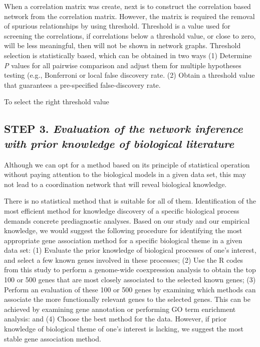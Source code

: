 When a correlation matrix was create, next is to construct the correlation based network from the correlation matrix. However, the matrix is required the removal of spurious relationships by using threshold. Threshold is a value used for screening the correlations, if correlations  below a threshold value, or close to zero, will be less meaningful, then will not be shown in network graphs. Threshold selection is statistically based, which can be obtained in two ways (1) Determine \textit{P} values for all pairwise comparison and adjust them for multiple hypotheses testing (e.g., Bonferroni or local false discovery rate. (2) Obtain a threshold value that guarantees a pre-specified false-discovery rate. 


To select the right threshold value


\subsection*{\textbf{STEP 3. }\textit{Evaluation of the network inference with  prior knowledge of biological literature}} %

 
Although we can opt for a method based on its principle of statistical operation without paying attention to the biological models in a given data set, this may not lead to a coordination network that will reveal biological knowledge. 


 


There is no statistical method that is suitable for all of them. Identification of the most efficient method for knowledge discovery of a specific biological process demands concrete prediagnostic analyses. Based on our study and our empirical knowledge, we would suggest the following procedure for identifying the most appropriate gene association method for a specific biological theme in a given data set: (1) Evaluate the prior knowledge of biological processes of one’s interest, and select a few known genes involved in these processes; (2) Use the R codes from this study to perform a genome-wide coexpression analysis to obtain the top 100 or 500 genes that are most closely associated to the selected known genes; (3) Perform an evaluation of these 100 or 500 genes by examining which methods can associate the more functionally relevant genes to the selected genes. This can be achieved by examining gene annotation or performing GO term enrichment analysis: and (4) Choose the best method for the data. However, if prior knowledge of biological theme of one’s interest is lacking, we suggest the most stable gene association method. 

